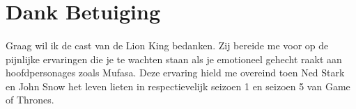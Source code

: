 \section* {Dank Betuiging}


\paragraph {} Graag wil ik de cast van de Lion King bedanken. Zij bereide me voor op de
pijnlijke ervaringen die je te wachten staan als je emotioneel gehecht raakt aan
hoofdpersonages zoals Mufasa. Deze ervaring hield me overeind toen Ned Stark en John Snow
het leven lieten in respectievelijk seizoen 1 en seizoen 5 van Game of Thrones.
